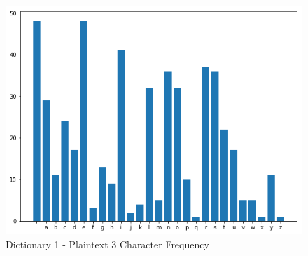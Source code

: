 \documentclass[12pt]{article}
\begin{document}
\begin{figure}[H]
    \centering
    \includegraphics[scale=0.5]{pt3.png}
    \caption{Dictionary 1 - Plaintext 3 Character Frequency}
    \label{fig:pt3}
\end{figure}
\end{document}

